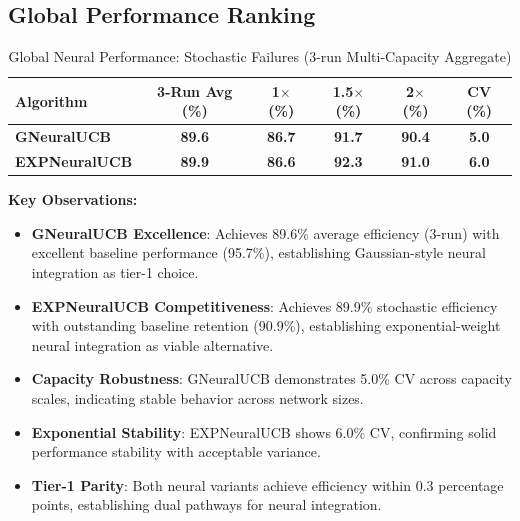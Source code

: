 \documentclass[12pt,a4paper]{article}
\newcommand{\success}[1]{\textcolor{accentgreen}{\textbf{#1}}}
\newcommand{\legacy}[1]{\textcolor{legacycolor}{\textbf{#1}}}
\newcommand{\neural}[1]{\textcolor{neuralcolor}{\textbf{#1}}}
\begin{document}
\begin{tcolorbox}[colback=tableheader,colframe=primaryblue,title=\textbf{Primary Neural Performance Results (Stochastic Environment, Attack Rate: 0.25)}]

\subsection{Global Performance Ranking}

\begin{table}[H]
\small
\centering
\caption{Global Neural Performance: Stochastic Failures (3-run Multi-Capacity Aggregate)}
\label{tab:global-performance-stochastic}
\begin{tabular}{@{}lccccc@{}}
\toprule
\textbf{Algorithm} & \textbf{3-Run Avg (\%)} & \textbf{1$\times$ (\%)} & \textbf{1.5$\times$ (\%)} & \textbf{2$\times$ (\%)} & \textbf{CV (\%)} \\
\midrule
\neural{GNeuralUCB}            & \neural{89.6} & \neural{86.7} & \neural{91.7} & \neural{90.4} & \neural{5.0} \\
\legacy{EXPNeuralUCB}           & \legacy{89.9} & \legacy{86.6} & \legacy{92.3} & \legacy{91.0} & \legacy{6.0} \\
\bottomrule
\end{tabular}
\end{table}

\textbf{Key Observations:}
\begin{itemize}
\item \neural{GNeuralUCB Excellence}: Achieves 89.6\% average efficiency (3-run) with excellent baseline performance (95.7\%), establishing Gaussian-style neural integration as tier-1 choice.
\item \legacy{EXPNeuralUCB Competitiveness}: Achieves 89.9\% stochastic efficiency with outstanding baseline retention (90.9\%), establishing exponential-weight neural integration as viable alternative.
\item \neural{Capacity Robustness}: GNeuralUCB demonstrates 5.0\% CV across capacity scales, indicating stable behavior across network sizes.
\item \legacy{Exponential Stability}: EXPNeuralUCB shows 6.0\% CV, confirming solid performance stability with acceptable variance.
\item \success{Tier-1 Parity}: Both neural variants achieve efficiency within 0.3 percentage points, establishing dual pathways for neural integration.
\end{itemize}
\end{tcolorbox}
\end{document}
